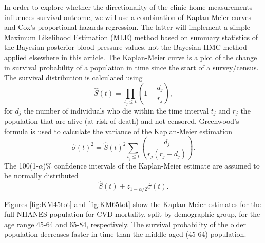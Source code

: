 \documentclass[
]{article}
\begin{document}
In order to explore whether the directionality of the clinic-home measurements influences survival outcome, we will use a combination of Kaplan-Meier curves and Cox's proportional hazards regression. The latter will implement a simple Maximum Likelihood Estimation (MLE) method based on summary statistics of the Bayesian posterior blood pressure values, not the Bayesian-HMC method applied elsewhere in this article. The Kaplan-Meier curve is a plot of the change in survival probability of a population in time since the start of a survey/census. The survival distribution is calculated using
\begin{equation}\label{survKM}
\hat{S}(t)=\prod_{t_j \le t}\left(1-\frac{d_j}{r_j} \right),
\end{equation}
for \(d_j\) the number of individuals who die within the time interval \(t_j\) and \(r_j\) the population that are alive (at risk of death) and not censored. Greenwood's formula is used to calculate the variance of the Kaplan-Meier estimation
\begin{equation}\label{sigKM}
\hat{\sigma}(t)^2=\hat{S}(t)^2\sum_{t_j \le t}\left(\frac{d_j}{r_j(r_j-d_j)} \right).
\end{equation}
The 100(1-\(\alpha\))\% confidence intervals of the Kaplan-Meier estimate are assumed to be normally distributed
\begin{equation}\label{CIKM}
\hat{S}(t) \pm z_{1-\alpha/2}\hat{\sigma}(t).
\end{equation}

Figures \ref{fig:KM45tot} and \ref{fig:KM65tot} show the Kaplan-Meier estimates for the full NHANES population for CVD mortality, split by demographic group, for the age range 45-64 and 65-84, respectively. The survival probability of the older population decreases faster in time than the middle-aged (45-64) population.
\end{document}
